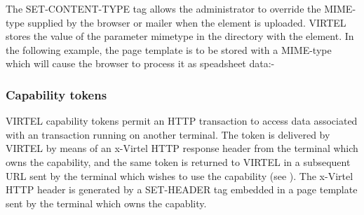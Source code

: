 \documentclass[letterpaper,10pt,english]{sphinxmanual}
\begin{document}
\begin{sphinxVerbatim}[commandchars=\\\{\}]
 
\end{sphinxVerbatim}

The SET-CONTENT-TYPE tag allows the administrator to override the MIME-type supplied by the browser or mailer when the element is uploaded. VIRTEL stores the value of the parameter mimetype in the directory with the element. In the following example, the page template is to be stored with a MIME-type which will cause the browser to process it as speadsheet data:-

\begin{sphinxVerbatim}[commandchars=\\\{\}]
 
\end{sphinxVerbatim}


\subsubsection{Capability tokens}
\label{\detokenize{User_Guide:v457ug-capability-tokens}}\label{\detokenize{User_Guide:capability-tokens}}

VIRTEL capability tokens permit an HTTP transaction to access data associated with an transaction running on another terminal. The token is delivered by VIRTEL by means of an x-Virtel HTTP response header from the terminal which owns the capability, and the same token is returned to VIRTEL in a subsequent URL sent by the terminal which wishes to use the capability (see {\hyperref[\detokenize{User_Guide:v457ug-capability-types}]{}}). The x-Virtel HTTP header is generated by a SET-HEADER tag
embedded in a page template sent by the terminal which owns the capablity.
\label{\detokenize{User_Guide:v457ug-set-header}}

\begin{sphinxVerbatim}[commandchars=\\\{\}]
    
\end{sphinxVerbatim}
\end{document}
